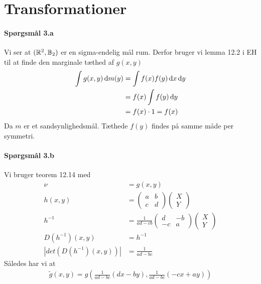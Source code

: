 \documentclass{article} %
\begin{document}
\section*{Transformationer} %
\label{sec:transformationer}
\paragraph*{Spørgsmål 3.a}
Vi ser at \(({\mathbb{R}}^2,{\mathbb{B}}_2)\) er en sigma-endelig mål rum. Derfor bruger vi lemma 12.2 i EH til at finde den marginale tæthed af \(g(x,y)\)
\begin{align}
    \int g(x,y)\dif m(y) & = \int f(x)f(y)\dif x\dif y \\
                         & = f(x)\int f(y)\dif y \\
                         & = f(x)\cdot 1 = f(x)
\end{align}
Da \(m\) er et sandsynlighedsmål. Tæthede \(f(y)\) findes på samme måde per symmetri.

\paragraph*{Spørgsmål 3.b}
Vi bruger teorem 12.14 med
\begin{align}
    \nu & = g(x,y) \\
    h(x,y) & =
    \begin{pmatrix}
    	a & b \\
    	c & d
    \end{pmatrix}
    \begin{pmatrix}
     	X \\
     	Y
    \end{pmatrix}\\
    h^{-1} & = \frac{1}{ad-cb}
    \begin{pmatrix}
    	d  & -b \\
    	-c & a
    \end{pmatrix}
    \begin{pmatrix}
     	X \\
     	Y
    \end{pmatrix} \\
    D\left(h^{-1}\right)(x,y) & = h^{-1} \\
    \left|det\left(D\left(h^{-1}\right)(x,y)\right)\right| & = \frac{1}{ad-bc}
\end{align}
Således har vi at
\begin{align}
    \tilde{g}(x,y)=g(\frac{1}{ad-bc}(dx-by),\frac{1}{ad-bc}(-cx+ay))
\end{align}
\end{document}
